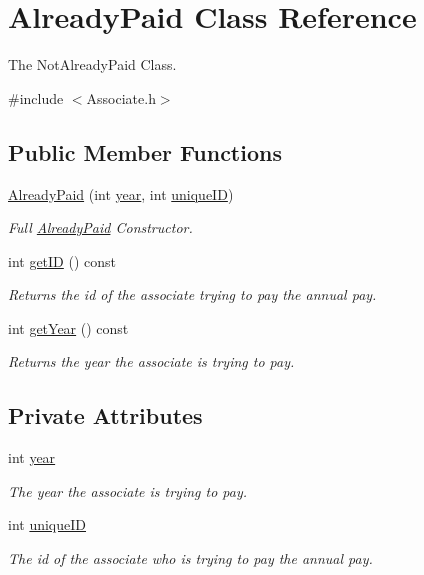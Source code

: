 \hypertarget{classAlreadyPaid}{}\section{Already\+Paid Class Reference}
\label{classAlreadyPaid}


The Not\+Already\+Paid Class.  




{\ttfamily \#include $<$Associate.\+h$>$}

\subsection*{Public Member Functions}
\begin{DoxyCompactItemize}
\item 
\hyperlink{classAlreadyPaid_afa3ccdeb73e3570b346a4938a836a44e}{Already\+Paid} (int \hyperlink{classAlreadyPaid_aca0124c0c69671e1452020fc8697c3ca}{year}, int \hyperlink{classAlreadyPaid_ad5c108176759cfd9d2f9ca2dd143d843}{unique\+ID})
\begin{DoxyCompactList}\small\item\em Full \hyperlink{classAlreadyPaid}{Already\+Paid} Constructor. \end{DoxyCompactList}\item 
int \hyperlink{classAlreadyPaid_a54d1869f925f98bb8621131debf5f2c8}{get\+ID} () const
\begin{DoxyCompactList}\small\item\em Returns the id of the associate trying to pay the annual pay. \end{DoxyCompactList}\item 
int \hyperlink{classAlreadyPaid_a9bc932f3c57052ce0508abc48b5a5a6c}{get\+Year} () const
\begin{DoxyCompactList}\small\item\em Returns the year the associate is trying to pay. \end{DoxyCompactList}\end{DoxyCompactItemize}
\subsection*{Private Attributes}
\begin{DoxyCompactItemize}
\item 
int \hyperlink{classAlreadyPaid_aca0124c0c69671e1452020fc8697c3ca}{year}
\begin{DoxyCompactList}\small\item\em The year the associate is trying to pay. \end{DoxyCompactList}\item 
int \hyperlink{classAlreadyPaid_ad5c108176759cfd9d2f9ca2dd143d843}{unique\+ID}
\begin{DoxyCompactList}\small\item\em The id of the associate who is trying to pay the annual pay. \end{DoxyCompactList}\end{DoxyCompactItemize}


